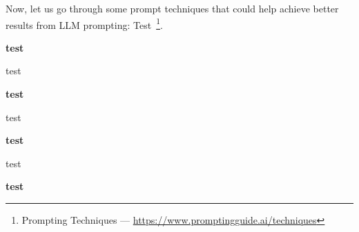 Now, let us go through some prompt techniques that could help achieve better results from LLM prompting:
Test~\footnote{Prompting Techniques --- \url{https://www.promptingguide.ai/techniques}}.

\textbf{test}

test

\textbf{test}

test

\textbf{test}

test

\textbf{test}








